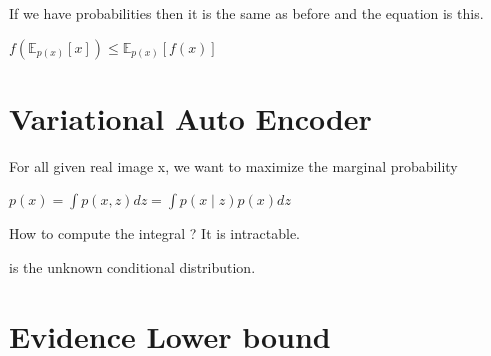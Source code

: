 \documentclass[../../../include/open-logic-chapter]{subfiles}
\begin{document}
If we have probabilities then it is the same as before and the equation is this.

$\mathit{f}\left( \mathbb{E}_{p(x)}[x]\right) \leq \mathbb{E}_{p(x)}[\mathit{f}(x)]$

\section{Variational Auto Encoder}

For all given real image x, we want to maximize the marginal probability

$p(x) = \int p(x,z) dz = \int p(x \mid z ) p(x) dz$

How to compute the integral ? It is intractable.


 is the unknown conditional distribution.

\section{Evidence Lower bound}
\end{document}
